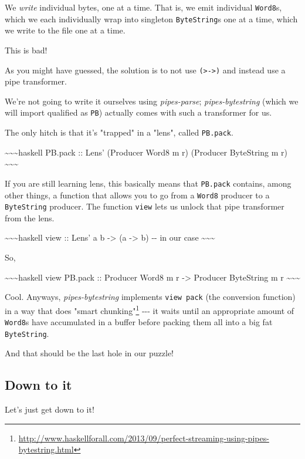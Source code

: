 \documentclass[]{article}
\renewcommand{\href}[2]{#2\footnote{\url{#1}}}
\begin{document}
We \emph{write} individual bytes, one at a time. That is, we emit individual
\texttt{Word8}s, which we each individually wrap into singleton
\texttt{ByteString}s one at a time, which we write to the file one at a time.

This is bad!

As you might have guessed, the solution is to not use
\texttt{(\textgreater{}-\textgreater{})} and instead use a pipe transformer.

We're not going to write it ourselves using \emph{pipes-parse};
\emph{pipes-bytestring} (which we will import qualified as \texttt{PB}) actually
comes with such a transformer for us.

The only hitch is that it's "trapped" in a "lens", called \texttt{PB.pack}.

\textasciitilde{}\textasciitilde{}\textasciitilde{}haskell PB.pack :: Lens'
(Producer Word8 m r) (Producer ByteString m r)
\textasciitilde{}\textasciitilde{}\textasciitilde{}

If you are still learning lens, this basically means that \texttt{PB.pack}
contains, among other things, a function that allows you to go from a
\texttt{Word8} producer to a \texttt{ByteString} producer. The function
\texttt{view} lets us unlock that pipe transformer from the lens.

\textasciitilde{}\textasciitilde{}\textasciitilde{}haskell view :: Lens' a b
-\textgreater{} (a -\textgreater{} b) -\/- in our case
\textasciitilde{}\textasciitilde{}\textasciitilde{}

So,

\textasciitilde{}\textasciitilde{}\textasciitilde{}haskell view PB.pack ::
Producer Word8 m r -\textgreater{} Producer ByteString m r
\textasciitilde{}\textasciitilde{}\textasciitilde{}

Cool. Anyways, \emph{pipes-bytestring} implements \texttt{view\ pack} (the
conversion function) in a way that does
\href{http://www.haskellforall.com/2013/09/perfect-streaming-using-pipes-bytestring.html}{"smart
chunking"} -\/-\/- it waits until an appropriate amount of \texttt{Word8}s have
accumulated in a buffer before packing them all into a big fat
\texttt{ByteString}.

And that should be the last hole in our puzzle!

\subsection{Down to it}

Let's just get down to it!
\end{document}
